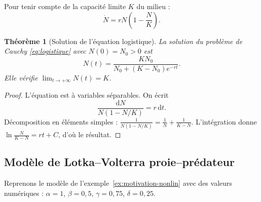 \documentclass[12pt,a4paper,openany]{book}
\theoremstyle{definition}
\theoremstyle{plain}
\newtheorem{theoreme}[definition]{Théorème}
\theoremstyle{remark}
\newcommand{\dd}{\mathrm{d}}
\begin{document}
Pour tenir compte de la capacité limite $K$ du milieu :
\begin{equation}
\label{eq:logistique}
\dot{N} = rN\!\left(1 - \frac{N}{K}\right).
\end{equation}

\begin{theoreme}[Solution de l'équation logistique]
\label{thm:sol-logistique}
La solution du problème de Cauchy \eqref{eq:logistique} avec
$N(0) = N_0 > 0$ est
\[
N(t) = \frac{KN_0}{N_0 + (K - N_0)e^{-rt}}.
\]
Elle vérifie $\lim_{t \to +\infty} N(t) = K$.
\end{theoreme}

\begin{proof}
L'équation est à variables séparables. On écrit
\[
\frac{\dd N}{N(1 - N/K)} = r\, \dd t.
\]
Décomposition en éléments simples :
$\frac{1}{N(1-N/K)} = \frac{1}{N} + \frac{1}{K-N}$.
L'intégration donne $\ln\frac{N}{K-N} = rt + C$, d'où le résultat.
\end{proof}

\begin{center}
\end{center}

\subsection{Modèle de Lotka--Volterra proie--prédateur}
\label{subsec:LV-application}

Reprenons le modèle de l'exemple~\ref{ex:motivation-nonlin} avec
des valeurs numériques : $\alpha = 1$, $\beta = 0{,}5$,
$\gamma = 0{,}75$, $\delta = 0{,}25$.
\end{document}
